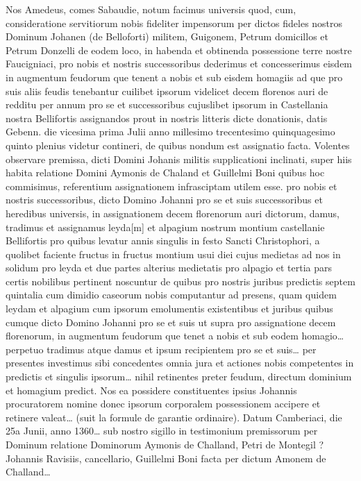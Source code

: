 \documentclass[a4paper,twoside,openany]{article}
\begin{document}
Nos Amedeus, comes Sabaudie, notum facimus universis
quod, cum, consideratione servitiorum nobis fideliter
impensorum per dictos fideles nostros Dominum Johanen
(de Belloforti) militem, Guigonem, Petrum domicillos et
Petrum Donzelli de eodem loco, in habenda et obtinenda
possessione terre nostre Faucigniaci, pro nobis et nostris
successoribus dederimus et concesserimus eisdem in
augmentum feudorum que tenent a nobis et sub eisdem
homagiis ad que pro suis aliis feudis tenebantur cuilibet
ipsorum videlicet decem florenos auri de redditu per annum
pro se et successoribus cujuslibet ipsorum in Castellania
nostra Bellifortis assignandos prout in nostris litteris dicte
donationis, datis Gebenn. die vicesima prima Julii anno
millesimo trecentesimo quinquagesimo quinto plenius
videtur contineri, de quibus nondum est assignatio facta.
Volentes observare premissa, dicti Domini Johanis militis
supplicationi inclinati, super hiis habita relatione Domini
Aymonis de Chaland et Guillelmi Boni quibus hoc
commisimus, referentium assignationem infrasciptam
utilem esse.
pro nobis et nostris successoribus, dicto Domino Johanni pro
se et suis successoribus et heredibus universis, in
assignationem decem florenorum auri dictorum, damus,
tradimus et assignamus leyda[m] et alpagium nostrum
montium castellanie Bellifortis pro quibus levatur annis
singulis in festo Sancti Christophori, a quolibet faciente
fructus in fructus montium usui diei cujus medietas ad nos in
solidum pro leyda et due partes alterius medietatis pro
alpagio et tertia pars certis nobilibus pertinent noscuntur de
quibus pro nostris juribus predictis septem quintalia cum
dimidio caseorum nobis computantur ad presens, quam
quidem leydam et alpagium cum ipsorum emolumentis
existentibus et juribus quibus cumque dicto Domino Johanni
pro se et suis ut supra pro assignatione decem florenorum,
in augmentum feudorum que tenet a nobis et sub eodem
homagio… perpetuo tradimus atque damus et ipsum
recipientem pro se et suis… per presentes investimus sibi
concedentes omnia jura et actiones nobis competentes in
predictis et singulis ipsorum… nihil retinentes preter
feudum, directum dominium et homagium predict. Nos ea
possidere constituentes ipsius Johannis procuratorem
nomine donec ipsorum corporalem possessionem accipere
et retinere valeat… (suit la formule de garantie ordinaire).
Datum Camberiaci, die 25a Junii, anno 1360… sub nostro
sigillo in testimonium premissorum per Dominum relatione
Dominorum Aymonis de Challand, Petri de Montegil ?
Johannis Ravisiis, cancellario, Guillelmi Boni facta per dictum
Amonem de Challand…
\end{document}
